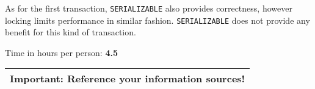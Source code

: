 \documentclass[11pt]{scrartcl}
\begin{document}
\subsubsection*{}
As for the first transaction, {\tt\small SERIALIZABLE} also provides correctness,
however locking limits performance in similar fashion. {\tt\small SERIALIZABLE}
does not provide any benefit for this kind of transaction.

\bigskip

\noindent Time in hours per person: {\bf 4.5}

\bigskip

\begin{center}
  \begin{tabular}{c}
    \hline
    {\bf Important:} Reference your information sources!
    \\\hline
  \end{tabular}
\end{center}
\end{document}
